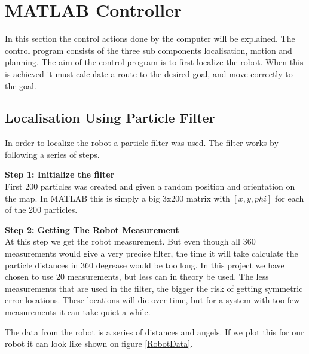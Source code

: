\section{MATLAB Controller}
In this section the control actions done by the computer will be explained. The control program consists of the three sub components localisation, motion and planning. The aim of the control program is to first localize the robot. When this is achieved it must calculate a route to the desired goal, and move correctly to the goal. 



\subsection{Localisation Using Particle Filter}
In order to localize the robot a particle filter was used. The filter works by following a series of steps. 

\textbf{Step 1: Initialize the filter}\\
First 200 particles was created and given a random position and orientation on the map. In MATLAB this is simply a big 3x200 matrix with $[x, y, phi]$ for each of the 200 particles. 

\textbf{Step 2: Getting The Robot Measurement}\\
At this step we get the robot measurement. But even though all 360 measurements would give a very precise filter, the time it will take calculate the particle distances in 360 degrease would be too long. In this project we have chosen to use 20 measurements, but less can in theory be used. The less measurements that are used in the filter, the bigger the risk of getting symmetric error locations. These locations will die over time, but for a system with too few measurements it can take quiet a while. 

The data from the robot is a series of distances and angels. If we plot this for our robot it can look like shown on figure \ref{RobotData}.

